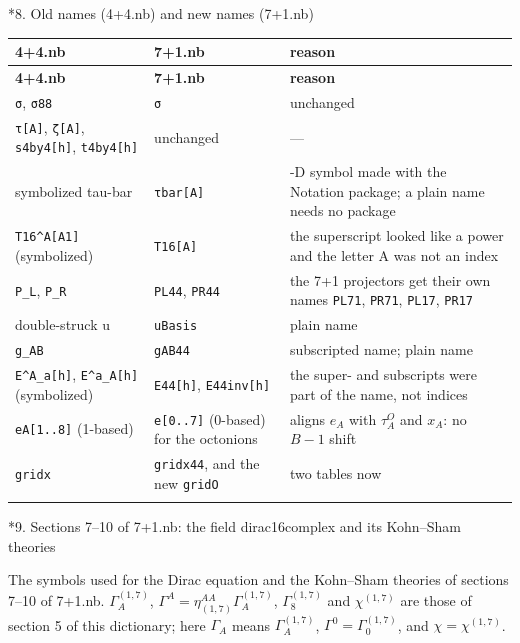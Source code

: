 \documentclass[10pt,a4paper]{article}
\makeatletter
\renewcommand\section{\@startsection{section}{1}{\z@}{-3.5ex \@plus -1ex \@minus -.2ex}{2.3ex \@plus.2ex}{\normalfont\Large\bfseries\raggedright}}
\makeatother
\begin{document}
\section*{8. Old names (4+4.nb) and new names (7+1.nb)}
{\small
\begin{longtable}{>{\raggedright\arraybackslash}p{}>{\raggedright\arraybackslash}p{}>{\raggedright\arraybackslash}p{}}
\toprule
\textbf{4+4.nb} & \textbf{7+1.nb} & \textbf{reason} \\
\midrule\endfirsthead
\toprule
\textbf{4+4.nb} & \textbf{7+1.nb} & \textbf{reason} \\
\midrule\endhead
\endfoot
\bottomrule\endlastfoot
\texttt{σ}, \texttt{σ88} & \texttt{σ} & unchanged \\
\texttt{τ[A]}, \texttt{ζ[A]}, \texttt{s4by4[h]}, \texttt{t4by4[h]} & unchanged & — \\
symbolized tau-bar & \texttt{τbar[A]} & 2-D symbol made with the Notation package; a plain name needs no package \\
\texttt{T16\textasciicircum{}A[A1]} (symbolized) & \texttt{T16[A]} & the superscript looked like a power and the letter A was not an index \\
\texttt{P\_\allowbreak{}L}, \texttt{P\_\allowbreak{}R} & \texttt{PL44}, \texttt{PR44} & the 7+1 projectors get their own names \texttt{PL71}, \texttt{PR71}, \texttt{PL17}, \texttt{PR17} \\
double-struck u & \texttt{uBasis} & plain name \\
\texttt{g\_\allowbreak{}AB} & \texttt{gAB44} & subscripted name; plain name \\
\texttt{E\textasciicircum{}A\_\allowbreak{}a[h]}, \texttt{E\textasciicircum{}a\_\allowbreak{}A[h]} (symbolized) & \texttt{E44[h]}, \texttt{E44inv[h]} & the super- and subscripts were part of the name, not indices \\
\texttt{eA[1..8]} (1-based) & \texttt{e[0..7]} (0-based) for the octonions & aligns $e_A$ with $\tau^{O}_A$ and $x_A$: no $B-1$ shift \\
\texttt{gridx} & \texttt{gridx44}, and the new \texttt{gridO} & two tables now \\*
\end{longtable}}
\section*{9. Sections 7–10 of 7+1.nb: the field dirac16complex and its Kohn–Sham theories}
The symbols used for the Dirac equation and the Kohn–Sham theories of sections 7–10 of 7+1.nb. $\Gamma^{(1,7)}_A$, $\Gamma^{A}=\eta_{(1,7)}^{AA}\Gamma^{(1,7)}_A$, $\Gamma^{(1,7)}_8$ and $\chi^{(1,7)}$ are those of section 5 of this dictionary; here $\Gamma_A$ means $\Gamma^{(1,7)}_A$, $\Gamma^0=\Gamma^{(1,7)}_0$, and $\chi=\chi^{(1,7)}$.
\end{document}
